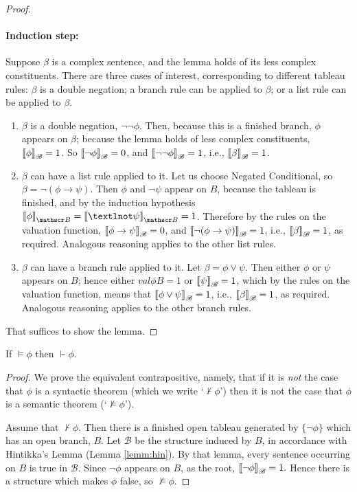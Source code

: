 \begin{proof}
\paragraph{Induction step:} Suppose $\beta$ is a complex sentence, and the lemma holds of its less complex constituents. There are three cases of interest, corresponding to different tableau rules: $\beta$ is a
double negation; a branch rule can be applied to $\beta$; or a list
rule can be applied to $\beta$. \begin{enumerate}
	\item $\beta$ is a double negation, $\neg\neg\phi$. Then, because this is a finished branch, $\phi$ appears on $\beta$; because the lemma holds of less complex constituents, $\left\llbracket \phi\right\rrbracket_{\mathscr{B}}=1$. So $\left\llbracket \neg\phi\right\rrbracket_{\mathscr{B}}=0$, and $\left\llbracket \neg\neg\phi\right\rrbracket_{\mathscr{B}}=1$, i.e., $\left\llbracket \beta\right\rrbracket_{\mathscr{B}}=1$.
  \item $\beta$ can have a list rule applied to it. Let us choose Negated
    Conditional, so $\beta = \neg(\phi \to \psi)$. Then $\phi$ and $\neg \psi$
    appear on $B$, because the tableau is finished, and by the induction hypothesis $\val{\phi}{B} = \val{¬\psi}{B} =1$. Therefore by the rules on the valuation function, $\left\llbracket \phi\to\psi\right\rrbracket_{\mathscr{B}}=0$, and $\left\llbracket \neg(\phi \to \psi)\right\rrbracket_{\mathscr{B}}=1$, i.e., $\left\llbracket \beta\right\rrbracket_{\mathscr{B}}=1$, as required. Analogous reasoning applies to the other list rules.
    \item $\beta$ can have a branch rule applied to it. Let $\beta = \phi
    \vee \psi$. Then either $\phi$ or $\psi$ appears on $B$; hence either
    $val{\phi}{B} = 1$ or $\left\llbracket \psi\right\rrbracket_{\mathscr{B}} =1$, which by the rules on the valuation function, means that $\left\llbracket \phi\vee\psi\right\rrbracket_{\mathscr{B}}=1$,  i.e., $\left\llbracket \beta\right\rrbracket_{\mathscr{B}}=1$, as required. Analogous reasoning applies to the other branch rules.
\end{enumerate}
    That suffices to show the lemma.\end{proof}



\begin{theorem}\label{thm:comp} If\/ $\vDash \phi$ then $\vdash
    \phi$.\end{theorem}\begin{proof} We prove the equivalent contrapositive, namely, that if
   it is {\em not} the case that $\phi$ is a syntactic theorem (which 
   we write `$\nvdash \phi$') then it is not the case that $\phi$ 
   is a semantic theorem (`$\nvDash \phi$').
    
Assume that $\nvdash \phi$. Then there is a finished open tableau generated by $\{\neg
\phi\}$ which has an open branch, $B$. Let $\mathscr{B}$ be the structure induced by $B$, in accordance with Hintikka's Lemma (Lemma \ref{lemm:hin}). By that lemma, every sentence occurring on $B$ is true in $\mathscr{B}$. Since $\neg\phi$ appears on $B$, as the root, $\left\llbracket \neg\phi\right\rrbracket_{\mathscr{B}}=1.$ Hence there is a structure which makes $\phi$ false, so $\nvDash \phi$.
\end{proof}

